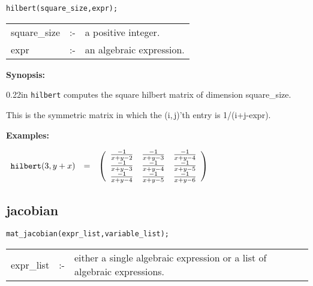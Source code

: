 
\hspace*{0.175in} {\tt hilbert(square\_size,expr);}

\hspace*{0.1in} 
\begin{tabular}{l l l}
square\_size &:-& a positive integer. \\
expr         &:-& an algebraic expression.
\end{tabular}

{\bf Synopsis:} %

\begin{addtolength}{\leftskip}{0.22in}
{\tt hilbert} computes the square hilbert matrix of 
                dimension square\_size. 

This is the symmetric matrix in
                which the (i,$\,$j)'th entry is 1/(i+j-expr).

\end{addtolength}

{\bf Examples:}

\begin{flushleft}  
\hspace*{0.1in}
\begin{math}        
\begin{array}{ccc}
{\tt hilbert}(3,y+x) & = & 
\left( \begin{array}{ccc} \frac{-1}{x+y-2} & \frac{-1}{x+y-3} 
& \frac{-1}{x+y-4} \\ \frac{-1}{x+y-3} & \frac{-1}{x+y-4} & 
\frac{-1}{x+y-5} \\ \frac{-1}{x+y-4} & \frac{-1}{x+y-5} & 
\frac{-1}{x+y-6} 
\end{array} \right)
\end{array}
\end{math}  
\end{flushleft}


\subsection{jacobian}


\hspace*{0.175in} {\tt mat\_jacobian(expr\_list,variable\_list);}

\hspace*{0.1in} 
\begin{tabular}{l l l}
expr\_list   \hspace*{0.175in}  &:-& \parbox[t]{.72\linewidth}{either a 
single algebraic expression or a list of algebraic expressions.} 
\end{tabular}

